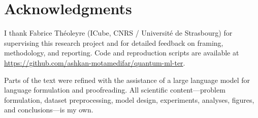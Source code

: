 \documentclass[11pt,a4paper]{article}
\let\OldSection\section
\let\OldSubsection\subsection
\let\OldSubsubsection\subsubsection
\renewcommand{\section}[1]{\OldSubsection{#1}}
\renewcommand{\subsection}[1]{\OldSubsubsection{#1}}
\begin{document}
\OldSection*{Acknowledgments}

I thank Fabrice Th\'{e}oleyre (ICube, CNRS / Universit\'{e} de Strasbourg) for supervising this research project and for detailed feedback on framing, methodology, and reporting. Code and reproduction scripts are available at
\url{https://github.com/ashkan-motamedifar/quantum-ml-ter}.

Parts of the text were refined with the assistance of a large language model for language formulation and proofreading. All scientific content---problem formulation, dataset preprocessing, model design, experiments, analyses, figures, and conclusions---is my own.

\appendix




\end{document}
